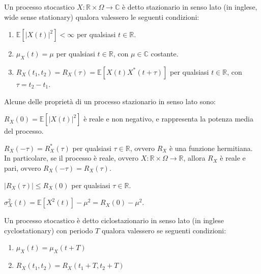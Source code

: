     \begin{definition}
        Un processo stocastico $X: \mathbb{R} \times \Omega \rightarrow \mathbb{C}$ è detto stazionario in senso lato (in inglese, wide sense stationary) qualora valessero le seguenti condizioni:
        \begin{enumerate}
            \item $\mathbb{E}[|X(t)|^2] < \infty$ per qualsiasi $t \in \mathbb{R}$.
            \item $\mu_{X}(t) = \mu$ per qualsiasi $t \in \mathbb{R}$, con $\mu \in \mathbb{C}$ costante.
            \item $R_{X}(t_1, t_2) = R_{X}(\tau) = \mathbb{E}[X(t)X^*(t + \tau)]$ per qualsiasi $t \in \mathbb{R}$, con $\tau = t_2 - t_1$.
        \end{enumerate}
    \end{definition}

    Alcune delle proprietà di un processo stazionario in senso lato sono:

    \begin{property}[Potenza]
        $R_{X}(0) = \mathbb{E}[|X(t)|^2]$ è reale e non negativo, e rappresenta la potenza media del processo.
    \end{property}

    \begin{property}[Simmetria]
        $R_{X}(-\tau) = R_{X}^*(\tau)$ per qualsiasi $\tau \in \mathbb{R}$, ovvero $R_{X}$ è una funzione hermitiana.
        In particolare, se il processo è reale, ovvero $X: \mathbb{R} \times \Omega \rightarrow \mathbb{R}$, allora $R_{X}$ è reale e pari, ovvero $R_{X}(-\tau) = R_{X}(\tau)$.
    \end{property}

    \begin{property}
        $|R_{X}(\tau)| \leq R_{X}(0)$ per qualsiasi $\tau \in \mathbb{R}$.
    \end{property}

    \begin{property}
        $\sigma_{X}^2(t) = \mathbb{E}[X^2(t)] - \mu^2 = R_{X}(0) - \mu^2$.
    \end{property}

    \begin{definition}
        Un processo stocastico è detto ciclostazionario in senso lato (in inglese cyclostationary) con periodo $T$ qualora valessero se seguenti condizioni:
        \begin{enumerate}
            \item $\mu_{X}(t) = \mu_{X}(t + T)$
            \item $R_{X}(t_1, t_2) = R_{X}(t_1 + T, t_2 + T)$
        \end{enumerate}
    \end{definition}

